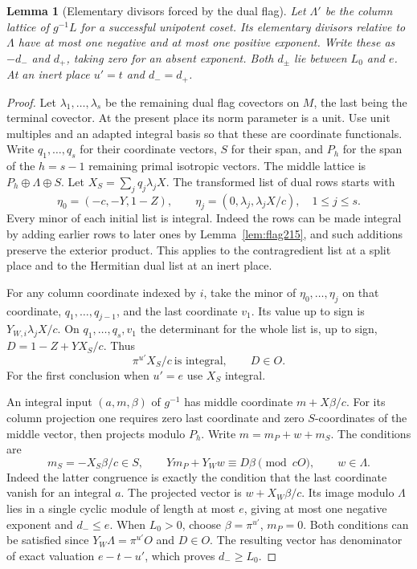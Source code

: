 \documentclass[a4paper,11pt]{article}
\newtheorem{lemma}[proposition]{Lemma}
\theoremstyle{definition}
\theoremstyle{remark}
\numberwithin{equation}{section}
\begin{document}
\begin{lemma}[Elementary divisors forced by the dual flag]\leavevmode
\label{lem:depth290}
Let \(\Lambda'\) be the column lattice of \(g^{-1}L\) for a
successful unipotent coset. Its elementary divisors relative
to \(\Lambda\) have at most one negative and at most one
positive exponent. Write these as \(-d_-\) and \(d_+\),
taking zero for an absent exponent. Both \(d_\pm\) lie between
\(L_0\) and \(e\). At an inert place \(u'=t\) and \(d_-=d_+\).
\end{lemma}
\begin{proof}
Let \(\lambda_1,\ldots,\lambda_s\) be the remaining dual
flag covectors on \(M\), the last being the terminal covector.
At the present place its norm parameter is a unit. Use unit
multiples and an adapted integral basis so that these are
coordinate functionals. Write \(q_1,\ldots,q_s\) for their
coordinate vectors, \(S\) for their span, and \(P_h\) for
the span of the \(h=s-1\) remaining primal isotropic vectors.
The middle lattice is \(P_h\oplus\Lambda\oplus S\).
Let \(X_S=\sum_j q_j\lambda_j X\). The transformed list of
dual rows starts with
\[
   \eta_0=(-c,-Y,1-Z),\qquad
   \eta_j=(0,\lambda_j,\lambda_j X/c),\quad 1\le j\le s .
\]
Every minor of each initial list is integral. Indeed the
rows can be made integral by adding earlier rows to later
ones by Lemma~\ref{lem:flag215}, and such additions preserve
the exterior product. This applies to the contragredient
list at a split place and to the Hermitian dual list at
an inert place.

For any column coordinate indexed by \(i\), take the minor
of \(\eta_0,\ldots,\eta_j\) on that coordinate,
\(q_1,\ldots,q_{j-1}\), and the last coordinate \(v_1\).
Its value up to sign is \(Y_{W,i}\lambda_j X/c\).
On \(q_1,\ldots,q_s,v_1\) the determinant for the whole list
is, up to sign, \(D=1-Z+YX_S/c\). Thus
\[
              \pi^{u'}X_S/c\ \text{is integral},
                     \qquad D\in O .
\]
For the first conclusion when \(u'=e\) use \(X_S\) integral.

An integral input \((a,m,\beta)\) of \(g^{-1}\) has middle
coordinate \(m+X\beta/c\). For its column projection one
requires zero last coordinate and zero \(S\)-coordinates of
the middle vector, then projects modulo \(P_h\). Write
\(m=m_P+w+m_S\). The conditions are
\[
   m_S=-X_S\beta/c\in S,\qquad
      Ym_P+Y_W w\equiv D\beta\pmod{cO},
      \qquad w\in\Lambda .
\]
Indeed the latter congruence is exactly the condition that
the last coordinate vanish for an integral \(a\).
The projected vector is \(w+X_W\beta/c\).
Its image modulo \(\Lambda\) lies in a single cyclic module
of length at most \(e\), giving at most one negative
exponent and \(d_-\le e\). When \(L_0>0\), choose
\(\beta=\pi^{u'}\), \(m_P=0\). Both conditions can be
satisfied since \(Y_W\Lambda=\pi^{u'}O\) and \(D\in O\).
The resulting vector has denominator of exact valuation
\(e-t-u'\), which proves \(d_-\ge L_0\).


\end{proof}
\end{document}
